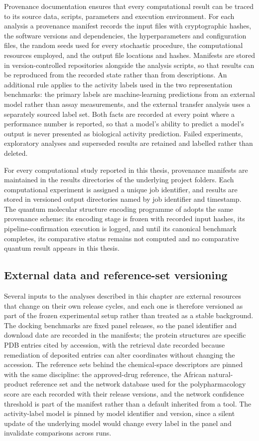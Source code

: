 Provenance documentation ensures that every computational result can be traced to its source data, scripts, parameters and execution environment. For each analysis a provenance manifest records the input files with cryptographic hashes, the software versions and dependencies, the hyperparameters and configuration files, the random seeds used for every stochastic procedure, the computational resources employed, and the output file locations and hashes. Manifests are stored in version-controlled repositories alongside the analysis scripts, so that results can be reproduced from the recorded state rather than from descriptions. An additional rule applies to the activity labels used in the two representation benchmarks: the primary labels are machine-learning predictions from an external model rather than assay measurements, and the external transfer analysis uses a separately sourced label set. Both facts are recorded at every point where a performance number is reported, so that a model's ability to predict a model's output is never presented as biological activity prediction. Failed experiments, exploratory analyses and superseded results are retained and labelled rather than deleted.

For every computational study reported in this thesis, provenance manifests are maintained in the results directories of the underlying project folders. Each computational experiment is assigned a unique job identifier, and results are stored in versioned output directories named by job identifier and timestamp. The quantum molecular structure encoding programme of  adopts the same provenance scheme: its encoding stage is frozen with recorded input hashes, its pipeline-confirmation execution is logged, and until its canonical benchmark completes, its comparative status remains not computed and no comparative quantum result appears in this thesis.

\subsection{External data and reference-set versioning}

Several inputs to the analyses described in this chapter are external resources that change on their own release cycles, and each one is therefore versioned as part of the frozen experimental setup rather than treated as a stable background. The docking benchmarks are fixed panel releases, so the panel identifier and download date are recorded in the manifests; the protein structures are specific PDB entries cited by accession, with the retrieval date recorded because remediation of deposited entries can alter coordinates without changing the accession. The reference sets behind the chemical-space descriptors are pinned with the same discipline: the approved-drug reference, the African natural-product reference set and the network database used for the polypharmacology score are each recorded with their release versions, and the network confidence threshold is part of the manifest rather than a default inherited from a tool. The activity-label model is pinned by model identifier and version, since a silent update of the underlying model would change every label in the panel and invalidate comparisons across runs.

